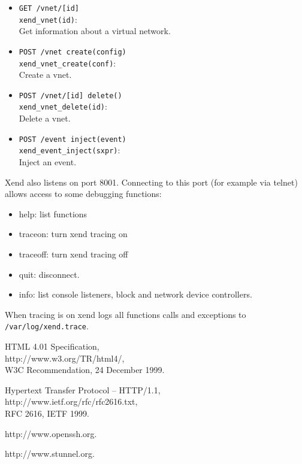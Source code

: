 \documentclass[11pt,twoside,final,openright]{report}
\begin{document}
\begin{itemize}
\item {\tt GET /vnet/[id]}\\
  {\tt xend\_vnet(id)}:\\
  Get information about a virtual network.

\item {\tt POST /vnet create(config)}\\
  {\tt xend\_vnet\_create(conf)}:\\
  Create a vnet.

\item {\tt POST /vnet/[id] delete()}\\
  {\tt xend\_vnet\_delete(id)}:\\
  Delete a vnet.

\item {\tt POST /event inject(event)}\\
  {\tt xend\_event\_inject(sxpr)}:\\
  Inject an event.

\end{itemize}

Xend also listens on port 8001. Connecting to this port (for example via telnet)
allows access to some debugging functions:
\begin{itemize}
\item help: list functions
\item traceon: turn xend tracing on
\item traceoff: turn xend tracing off
\item quit: disconnect.
\item info: list console listeners, block and network device controllers.
\end{itemize}

When tracing is on xend logs all functions calls and exceptions to
{\tt /var/log/xend.trace}.

\begin{thebibliography}{99}

HTML 4.01 Specification,\\
http://www.w3.org/TR/html4/,\\
W3C Recommendation, 24 December 1999.

Hypertext Transfer Protocol -- HTTP/1.1,\\
http://www.ietf.org/rfc/rfc2616.txt,\\
RFC 2616, IETF 1999.

http://www.openssh.org.

http://www.stunnel.org.

\end{thebibliography}
\end{document}
